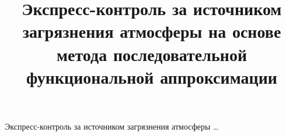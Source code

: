 




%








%












\renewcommand{\firstpage}{210}


\renewcommand{\lastpage}{214}




































\title{Экспресс-контроль за источником загрязнения атмосферы на основе метода последовательной функциональной аппроксимации}%


{Экспресс-контроль за источником загрязнения атмосферы \dots}%





